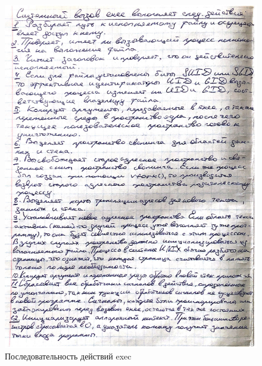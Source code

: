 \documentclass[12pt]{report}
\begin{document}
\begin{figure}[H]
	\centering
	\includegraphics[scale = 0.8]{2.jpg}
	\caption{Последовательность действий exec}
	\label{task05:demo}
\end{figure}

\end{document}
